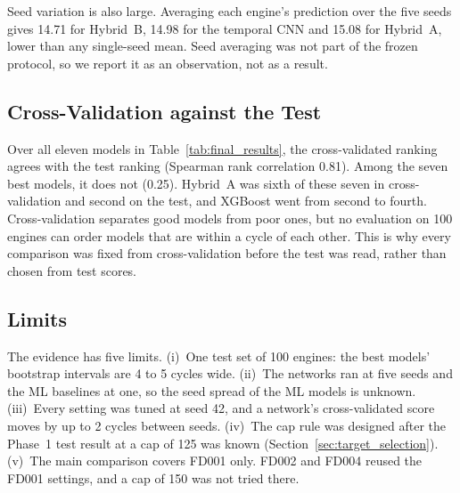 Seed variation is also large. Averaging each engine's prediction over the five
seeds gives 14.71 for Hybrid~B, 14.98 for the temporal CNN and 15.08 for
Hybrid~A, lower than any single-seed mean. Seed averaging was not part of the
frozen protocol, so we report it as an observation, not as a result.

\subsection{Cross-Validation against the Test}
Over all eleven models in Table~\ref{tab:final_results}, the cross-validated
ranking agrees with the test ranking (Spearman rank correlation 0.81). Among
the seven best models, it does not (0.25). Hybrid~A was sixth of these seven
in cross-validation and second on the test, and XGBoost went from second to
fourth. Cross-validation separates
good models from poor ones, but no evaluation on 100 engines can order models
that are within a cycle of each other. This is why every comparison was fixed
from cross-validation before the test was read, rather than chosen from test
scores.

\subsection{Limits}
The evidence has five limits. (i)~One test set of 100 engines: the best
models' bootstrap intervals are 4 to 5 cycles wide. (ii)~The networks ran at five seeds
and the ML baselines at one, so the seed spread of the ML models is unknown.
(iii)~Every setting was tuned at seed 42, and a network's cross-validated score
moves by up to 2 cycles between seeds. (iv)~The cap rule was designed after the
Phase~1 test result at a cap of 125 was known
(Section~\ref{sec:target_selection}). (v)~The main comparison covers FD001 only.
FD002 and FD004 reused the FD001 settings, and a cap of 150 was not tried
there.
